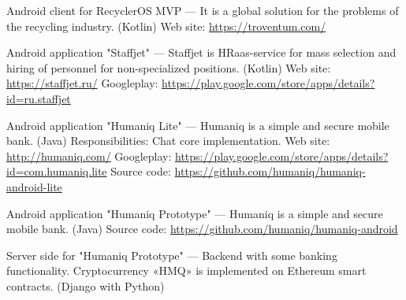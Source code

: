 \begin{cventries}
{\begin{cvitems}
{        \begin{flushleft}
            Android client for RecyclerOS MVP — It is a global solution for the problems of the recycling industry. (Kotlin)\linebreak
            Web site: \url{https://troventum.com/}\linebreak
        \end{flushleft}
    }
    \item {
        \begin{flushleft}
            Android application "Staffjet" --- Staffjet is HRaas-service for mass selection and hiring of personnel for non-specialized positions. (Kotlin)\linebreak
            Web site: \url{https://staffjet.ru/}\linebreak
            Googleplay: \url{https://play.google.com/store/apps/details?id=ru.staffjet}\linebreak
        \end{flushleft}
    }
    \item {
        \begin{flushleft}
            Android application "Humaniq Lite" --- Humaniq is a simple and secure mobile bank. (Java)\linebreak
            Responsibilities: Chat core implementation.\linebreak
            Web site: \url{http://humaniq.com/}\linebreak
            Googleplay: \url{https://play.google.com/store/apps/details?id=com.humaniq.lite}\linebreak
            Source code: \url{https://github.com/humaniq/humaniq-android-lite}\linebreak
        \end{flushleft}
    }
    \item {
        \begin{flushleft}
            Android application "Humaniq Prototype" --- Humaniq is a simple and secure mobile bank. (Java)\linebreak
            Source code: \url{https://github.com/humaniq/humaniq-android}\linebreak
        \end{flushleft}
    }
    \item {
        \begin{flushleft}
            Server side for "Humaniq Prototype" ---
            Backend with some banking functionality. Cryptocurrency «HMQ» is implemented on Ethereum smart contracts. (Django with Python)\linebreak

\end{flushleft}}
\end{cvitems}}
\end{cventries}
